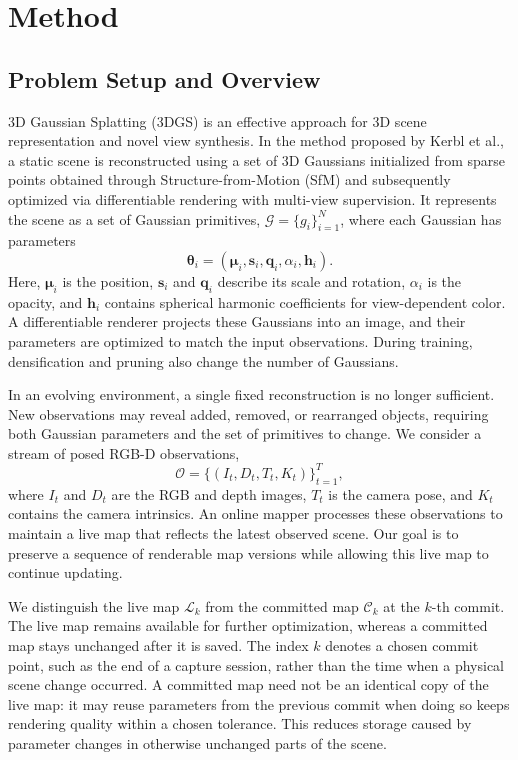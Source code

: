 
\section{Method}

\subsection{Problem Setup and Overview}
\label{sec:problem_setup}


3D Gaussian Splatting (3DGS) is an effective approach for 3D scene representation and novel view synthesis. In the method proposed by Kerbl et al., a static scene is reconstructed using a set of 3D Gaussians initialized from sparse points obtained through Structure-from-Motion (SfM) and subsequently optimized via differentiable rendering with multi-view supervision.
It represents the scene as a set of Gaussian primitives,
$\mathcal{G}=\{g_i\}_{i=1}^{N}$, where each Gaussian has parameters
\begin{equation}
    \boldsymbol{\theta}_i =
    (\boldsymbol{\mu}_i,\boldsymbol{s}_i,\boldsymbol{q}_i,
    \alpha_i,\boldsymbol{h}_i).
\end{equation}
Here, $\boldsymbol{\mu}_i$ is the position,
$\boldsymbol{s}_i$ and $\boldsymbol{q}_i$ describe its scale and rotation,
$\alpha_i$ is the opacity, and $\boldsymbol{h}_i$ contains spherical
harmonic coefficients for view-dependent color.
A differentiable renderer projects these Gaussians into an image,
and their parameters are optimized to match the input observations.
During training, densification and pruning also change the number
of Gaussians.

In an evolving environment, a single fixed reconstruction is no
longer sufficient.
New observations may reveal added, removed, or rearranged objects,
requiring both Gaussian parameters and the set of primitives to change.
We consider a stream of posed RGB-D observations,
\begin{equation}
    \mathcal{O} =
    \{(I_t,D_t,T_t,K_t)\}_{t=1}^{T},
\end{equation}
where $I_t$ and $D_t$ are the RGB and depth images,
$T_t$ is the camera pose, and $K_t$ contains the camera intrinsics.
An online mapper processes these observations to maintain a live map
that reflects the latest observed scene.
Our goal is to preserve a sequence of renderable map versions
while allowing this live map to continue updating.

We distinguish the live map $\mathcal{L}_k$ from the committed map
$\mathcal{C}_k$ at the $k$-th commit.
The live map remains available for further optimization,
whereas a committed map stays unchanged after it is saved.
The index $k$ denotes a chosen commit point, such as the end of a
capture session, rather than the time when a physical scene change
occurred.
A committed map need not be an identical copy of the live map:
it may reuse parameters from the previous commit when doing so
keeps rendering quality within a chosen tolerance.
This reduces storage caused by parameter changes in otherwise
unchanged parts of the scene.


